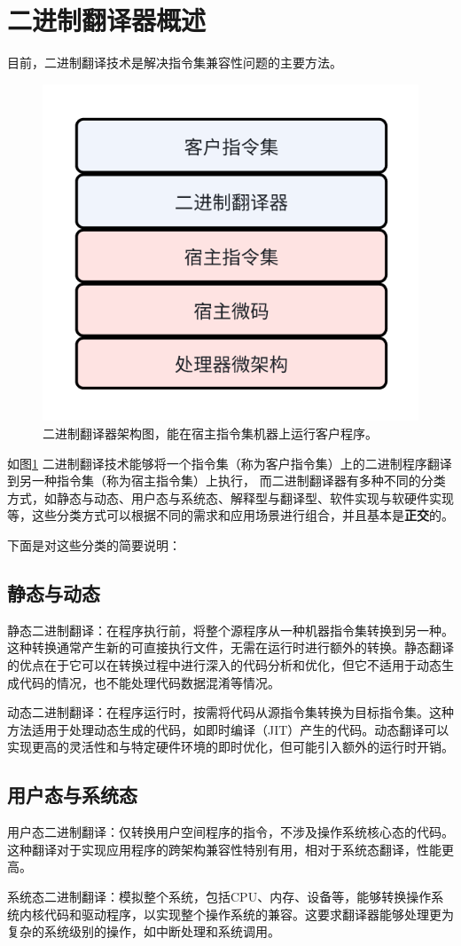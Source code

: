 \section{二进制翻译器概述}
目前，二进制翻译技术是解决指令集兼容性问题的主要方法。

\begin{figure}[h]
  \centering
  \includegraphics[width=0.3\linewidth]{./feishuImage/BT_arch.png}
  \caption{二进制翻译器架构图，能在宿主指令集机器上运行客户程序。}
  \label{img:BT_arch}
\end{figure}

如图\ref{img:BT_arch} 二进制翻译技术能够将一个指令集（称为客户指令集）上的二进制程序翻译到另一种指令集（称为宿主指令集）上执行，
而二进制翻译器有多种不同的分类方式，如静态与动态、用户态与系统态、解释型与翻译型、软件实现与软硬件实现等，这些分类方式可以根据不同的需求和应用场景进行组合，并且基本是\textbf{正交}的。

下面是对这些分类的简要说明：

\subsection{静态与动态}
静态二进制翻译：在程序执行前，将整个源程序从一种机器指令集转换到另一种。这种转换通常产生新的可直接执行文件，无需在运行时进行额外的转换。静态翻译的优点在于它可以在转换过程中进行深入的代码分析和优化，但它不适用于动态生成代码的情况，也不能处理代码数据混淆等情况。

动态二进制翻译：在程序运行时，按需将代码从源指令集转换为目标指令集。这种方法适用于处理动态生成的代码，如即时编译（JIT）产生的代码。动态翻译可以实现更高的灵活性和与特定硬件环境的即时优化，但可能引入额外的运行时开销。


\subsection{用户态与系统态}
用户态二进制翻译：仅转换用户空间程序的指令，不涉及操作系统核心态的代码。这种翻译对于实现应用程序的跨架构兼容性特别有用，相对于系统态翻译，性能更高。

系统态二进制翻译：模拟整个系统，包括CPU、内存、设备等，能够转换操作系统内核代码和驱动程序，以实现整个操作系统的兼容。这要求翻译器能够处理更为复杂的系统级别的操作，如中断处理和系统调用。

